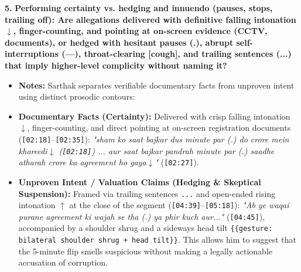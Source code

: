 \documentclass[10pt,a4paper]{article}
\begin{document}
\noindent\textbf{5.} \textbf{Performing certainty vs. hedging and innuendo (pauses, stops, trailing off): Are allegations delivered with definitive falling intonation $\downarrow$, finger-counting, and pointing at on-screen evidence (CCTV, documents), or hedged with hesitant pauses (.), abrupt self-interruptions (---), throat-clearing [cough], and trailing sentences (...) that imply higher-level complicity without naming it?}\par\smallskip
\begin{itemize}
  \item \textbf{Notes:}
Sarthak separates verifiable documentary facts from unproven intent using distinct prosodic contours:\par\smallskip
  \item \textbf{Documentary Facts (Certainty):} Delivered with crisp falling intonation \texttt{$\downarrow$}, finger-counting, and direct pointing at on-screen registration documents (\texttt{[02:18]}--\texttt{[02:35]}): \textit{"sham ko saat bajkar dus minute par (.) do crore mein khareedi$\downarrow$ (\texttt{[02:18]}) ... aur saat bajkar pandrah minute par (.) saadhe atharah crore ka agreement ho gaya$\downarrow$"} (\texttt{[02:27]}).
  \item \textbf{Unproven Intent / Valuation Claims (Hedging \& Skeptical Suspension):} Framed via trailing sentences \texttt{...} and open-ended rising intonation \texttt{$\uparrow$} at the close of the segment (\texttt{[04:39]}--\texttt{[05:18]}): \textit{"Ab ye waqai purane agreement ki wajah se tha (.) ya phir kuch aur..."} (\texttt{[04:45]}), accompanied by a shoulder shrug and a sideways head tilt \texttt{\{\{gesture: bilateral shoulder shrug + head tilt\}\}}. This allows him to suggest that the 5-minute flip smells suspicious without making a legally actionable accusation of corruption.
\end{itemize}
\end{document}
